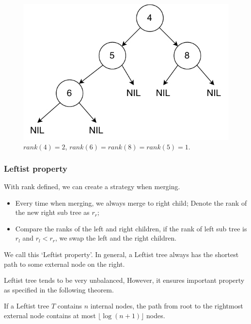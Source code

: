 \documentclass[b5paper]{article}
\begin{document}
\begin{figure}[htbp]
   \begin{center}
     \includegraphics[scale=0.5]{img/rank}
     \caption{$rank(4) = 2$, $rank(6) = rank(8) = rank(5) = 1$.} \label{fig:rank}
   \end{center}
\end{figure}

\subsubsection{Leftist property}

With rank defined, we can create a strategy when merging.

\begin{itemize}
\item Every time when merging, we always merge to right child; Denote the rank
of the new right sub tree as $r_r$;
\item Compare the ranks of the left and right children, if the rank of
left sub tree is $r_l$ and $r_l < r_r$, we swap the left and the right children.
\end{itemize}

We call this `Leftist property'. In general, a Leftist tree always
has the shortest path to some external node on the right.

Leftist tree tends to be very unbalanced, However, it ensures important
property as specified in the following theorem.

\begin{theorem}
If a Leftist tree $T$ contains $n$ internal nodes, the path from root to the
rightmost external node contains at most $\lfloor \log (n+1) \rfloor$ nodes.
\end{theorem}
\end{document}
